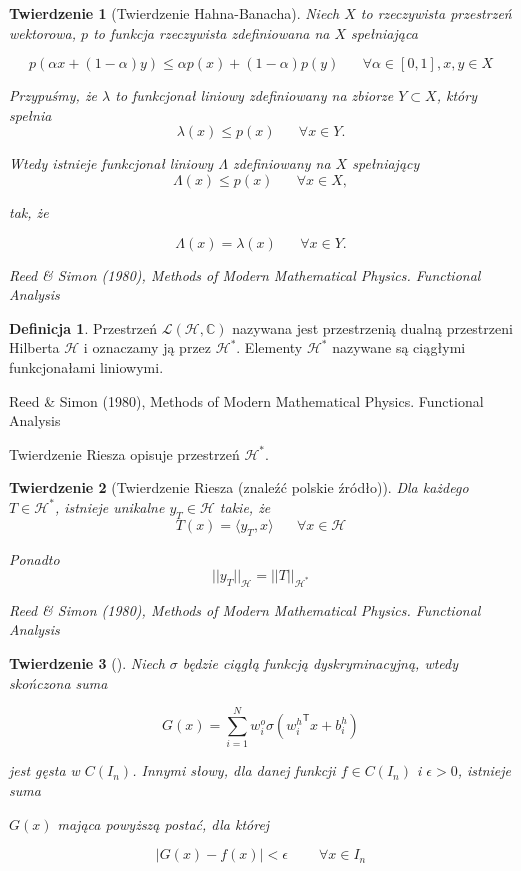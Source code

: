 \documentclass[]{article}
\newtheorem{theorem}{Twierdzenie}[section]
\theoremstyle{definition}
\newtheorem{definition}{Definicja}[section]
\begin{document}
\begin{theorem}[Twierdzenie Hahna-Banacha]
	
	
	Niech $X$ to rzeczywista przestrzeń wektorowa, $p$ to funkcja rzeczywista zdefiniowana na $X$ spełniająca
	
	$$	p \left(\alpha x + (1-\alpha) y \right) \leq \alpha p(x)  + (1 - \alpha)p(y) \;\;\;\;\;\; \forall \alpha \in \left[0,1\right], x, y \in X$$
	
	
	Przypuśmy, że $\lambda$ to funkcjonał liniowy zdefiniowany na zbiorze $Y\subset X $, który spełnia
	$$\lambda(x) \leq p(x) \;\;\;\;\;\; \forall x \in Y.$$
	
	
	Wtedy istnieje funkcjonał liniowy $\Lambda$ zdefiniowany na $X$ spełniający
	$$\Lambda(x) \leq p(x) \;\;\;\;\;\; \forall x \in X,$$
	
	tak, że
	
	$$\Lambda(x) = \lambda(x) \;\;\;\;\;\; \forall x \in Y.$$
	

Reed \& Simon (1980), Methods of Modern Mathematical Physics. Functional Analysis
\end{theorem}


\begin{definition}	
	
	Przestrzeń $\mathcal{L}\left(\mathcal{H}, \mathbb{C}\right)$ nazywana jest przestrzenią dualną przestrzeni Hilberta $\mathcal{H}$ i oznaczamy ją przez $\mathcal{H^*}$. Elementy $\mathcal{H^*}$ nazywane są ciągłymi funkcjonałami liniowymi.
	
	
Reed \& Simon (1980), Methods of Modern Mathematical Physics. Functional Analysis
	
\end{definition}	


Twierdzenie Riesza opisuje przestrzeń $\mathcal{H^*}$.  

	
\begin{theorem}[Twierdzenie Riesza (znaleźć polskie źródło)]
	
Dla każdego $T \in \mathcal{H^*}$, istnieje unikalne $y_T \in \mathcal{H}$ takie, że $$T(x) = \langle y_T, x \rangle \;\;\;\;\;\; \forall x \in \mathcal{H} $$
	
	
Ponadto $$||y_T ||_{\mathcal{H}}  = ||T||_{\mathcal{H^*}}$$

Reed \& Simon (1980), Methods of Modern Mathematical Physics. Functional Analysis

\end{theorem}


\begin{theorem}[]
	
	Niech $\sigma$ będzie ciągłą funkcją dyskryminacyjną, wtedy skończona suma
	
\begin{equation}
G\left(x\right) = \sum_{i=1}^{N} w^{o}_i \sigma\left({w^h_i}^{\mathsf{T}}x + b^h_i\right)
\end{equation}

jest gęsta w $C(I_n)$. Innymi słowy, dla danej funkcji $f \in C(I_n)$ i $\epsilon >0$, istnieje suma

$G(x)$ mająca powyższą postać, dla której

$$
|G(x) - f(x)| < \epsilon \;\;\;\;\;\;\;\; \forall x \in I_n
$$
\end{theorem}
\end{document}
